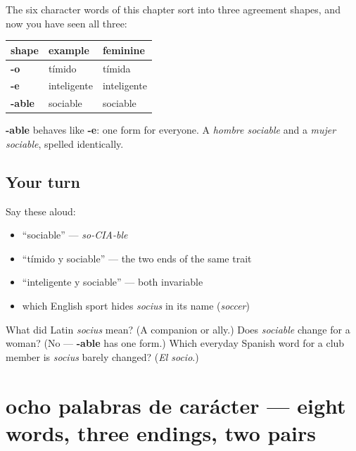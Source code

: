 \begin{grammarlens}[title={What you've built}]
The six character words of this chapter sort into three agreement shapes, and now you have seen all three:

\noindent
\begin{tabularx}{\linewidth}{@{}>{\raggedright\arraybackslash}X>{\raggedright\arraybackslash}X>{\raggedright\arraybackslash}X@{}}
\toprule
\textbf{shape} & \textbf{example} & \textbf{feminine} \\
\midrule
\textbf{-o} & tímido & tímida \\
\textbf{-e} & inteligente & inteligente \\
\textbf{-able} & sociable & sociable \\
\bottomrule
\end{tabularx}

\textbf{-able} behaves like \textbf{-e}: one form for everyone. A \emph{hombre sociable} and a \emph{mujer sociable}, spelled identically.
\end{grammarlens}

\subsection*{Your turn}
Say these aloud:

\begin{itemize}
\raggedright
  \item \textquotedblleft{}sociable\textquotedblright{} — \emph{so-CIA-ble}
  \item \textquotedblleft{}tímido y sociable\textquotedblright{} — the two ends of the same trait
  \item \textquotedblleft{}inteligente y sociable\textquotedblright{} — both invariable
  \item which English sport hides \emph{socius} in its name (\emph{soccer})
\end{itemize}

\begin{tcolorbox}[breakable,colback=teal!4,colframe=teal!35!black,title={Before you move on}]
What did Latin \emph{socius} mean? (A companion or ally.) Does \emph{sociable} change for a woman? (No — \textbf{-able} has one form.) Which everyday Spanish word for a club member is \emph{socius} barely changed? (\emph{El socio}.)
\end{tcolorbox}
\section[ocho palabras de carácter]{ocho palabras de carácter — eight words, three endings, two pairs}


